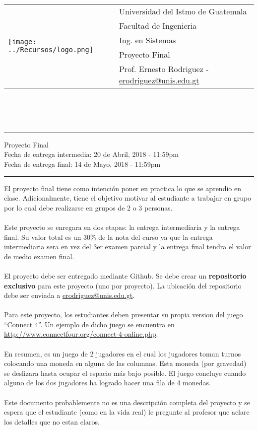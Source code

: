 \documentclass{article}
\newcommand{\horrule}[1]{\rule{\linewidth}{#1}}
\begin{document}
\begin{tabular}{l l}
\multirow{5}{*}{\texttt{[image: ../Recursos/logo.png]}} & Universidad del Istmo de Guatemala \\
 & Facultad de Ingenieria \\
 & Ing. en Sistemas \\
 & Proyecto Final \\
 & Prof. Ernesto Rodriguez - \href{mailto:erodriguez@unis.edu.gt}{erodriguez@unis.edu.gt} \\
\end{tabular}
\\\\\\

\begin{center}
        \horrule{0.5pt}
        \huge{Proyecto Final} \\
        \large{Fecha de entrega intermedia: 20 de Abril, 2018 - 11:59pm} \\
        \large{Fecha de entrega final: 14 de Mayo, 2018 - 11:59pm} \\
        \horrule{1pt}
\end{center}

El proyecto final tiene como intenci\'on poner en practica lo
que se aprendio en clase. Adicionalmente, tiene el objetivo
motivar al estudiante a trabajar en grupo por lo cual debe
realizarse en grupos de 2 o 3 personas.
\\\\
Este proyecto se enregara en dos etapas: la entrega intermediaria
y la entrega final. Su valor total es un 30\% de la nota del curso
ya que la entrega intermediaria sera en vez del 3er examen parcial
y la entrega final tendra el valor de medio examen final.
\\\\
El proyecto debe ser entregado mediante Github. Se debe crear un
{\bf repositorio exclusivo} para este proyecto (uno por proyecto).
La ubicaci\'on del repositorio debe ser enviada a 
\href{mailto:erodriguez@unis.edu.gt}{erodriguez@unis.edu.gt}.
\\\\
Para este proyecto, los estudiantes deben presentar su propia
version del juego ``Connect 4''. Un ejemplo de dicho juego se
encuentra en \url{http://www.connectfour.org/connect-4-online.php}.
\\\\
En resumen, es un juego de 2 jugadores en el cual los jugadores
toman turnos colocando una moneda en alguna de las columnas.
Esta moneda (por gravedad) se deslizara hasta ocupar el espacio
m\'as bajo posible. El juego concluye cuando alguno de los dos
jugadores ha logrado hacer una fila de 4 monedas.
\\\\
Este documento probablemente no es una descripci\'on completa
del proyecto y se espera que el estudiante (como en la vida real)
le pregunte al profesor que aclare los detalles que no estan
claros.
\end{document}
